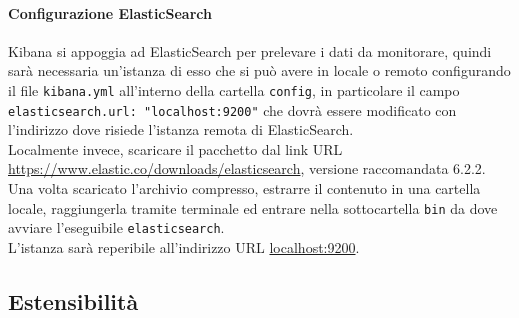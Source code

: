 \paragraph{Configurazione ElasticSearch}
Kibana si appoggia ad ElasticSearch per prelevare i dati da monitorare, quindi sarà necessaria un'istanza di esso che si può avere in locale o remoto configurando il file \texttt{kibana.yml} all'interno della cartella \texttt{config}, in particolare il campo \texttt{elasticsearch.url: "localhost:9200"} che dovrà essere modificato con l'indirizzo dove risiede l'istanza remota di ElasticSearch.\\
Localmente invece, scaricare il pacchetto dal link URL \url{https://www.elastic.co/downloads/elasticsearch}, versione raccomandata 6.2.2.
Una volta scaricato l'archivio compresso, estrarre il contenuto in una cartella locale, raggiungerla tramite terminale ed entrare nella sottocartella \texttt{bin} da dove avviare l'eseguibile \texttt{elasticsearch}.\\
L'istanza sarà reperibile all'indirizzo URL \url{localhost:9200}.
\subsection{Estensibilità}











